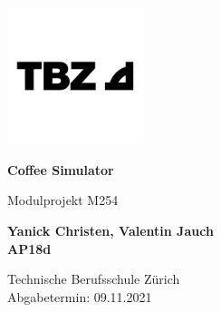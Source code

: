 \begin{titlepage}
    \center\includegraphics[width=0.3\textwidth]{resources/tbz_logo}
    \begin{center}
        \vspace*{2cm}
        \Huge
        \textbf{Coffee Simulator}

        \vspace{0.5cm}
        \LARGE
        Modulprojekt M254

        \vfill

        \Large
        \textbf{Yanick Christen, Valentin Jauch\\AP18d}

        \vspace*{1cm}

        \large
        Technische Berufsschule Zürich\\
        Abgabetermin: 09.11.2021
    \end{center}
\end{titlepage}